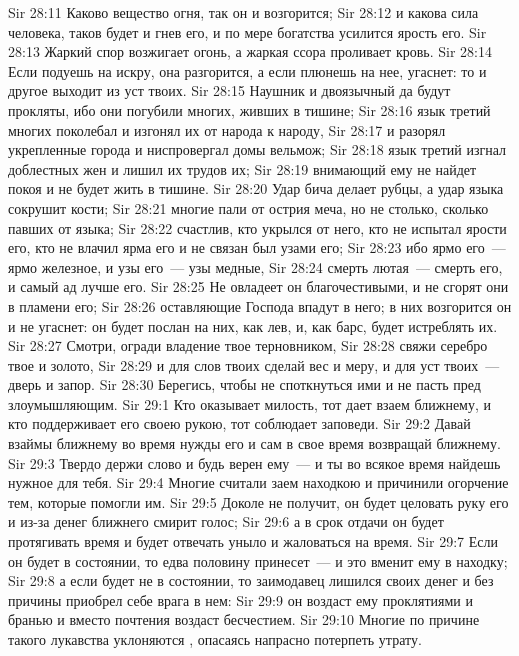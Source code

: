 \vs Sir 28:11 Каково вещество огня, так он и возгорится;
\vs Sir 28:12 и какова сила человека, таков будет и гнев его, и по мере богатства усилится ярость его.
\vs Sir 28:13 Жаркий спор возжигает огонь, а жаркая ссора проливает кровь.
\vs Sir 28:14 Если подуешь на искру, она разгорится, а если плюнешь на нее, угаснет: то и другое выходит из уст твоих.
\rsbpar\vs Sir 28:15 Наушник и двоязычный да будут прокляты, ибо они погубили многих, живших в тишине;
\vs Sir 28:16 язык третий многих поколебал и изгонял их от народа к народу,
\vs Sir 28:17 и разорял укрепленные города и ниспровергал домы вельмож;
\vs Sir 28:18 язык третий изгнал доблестных жен и лишил их трудов их;
\vs Sir 28:19 внимающий ему не найдет покоя и не будет жить в тишине.
\vs Sir 28:20 Удар бича делает рубцы, а удар языка сокрушит кости;
\vs Sir 28:21 многие пали от острия меча, но не столько, сколько павших от языка;
\vs Sir 28:22 счастлив, кто укрылся от него, кто не испытал ярости его, кто не влачил ярма его и не связан был узами его;
\vs Sir 28:23 ибо ярмо его~--- ярмо железное, и узы его~--- узы медные,
\vs Sir 28:24 смерть лютая~--- смерть его, и самый ад лучше его.
\vs Sir 28:25 Не овладеет он благочестивыми, и не сгорят они в пламени его;
\vs Sir 28:26 оставляющие Господа впадут в него; в них возгорится он и не угаснет: он будет послан на них, как лев, и, как барс, будет истреблять их.
\vs Sir 28:27 Смотри, огради владение твое терновником,
\vs Sir 28:28 свяжи серебро твое и золото,
\vs Sir 28:29 и для слов твоих сделай вес и меру, и для уст твоих~--- дверь и запор.
\vs Sir 28:30 Берегись, чтобы не споткнуться ими и не пасть пред злоумышляющим.
\vs Sir 29:1 Кто оказывает милость, тот дает взаем ближнему, и кто поддерживает его своею рукою, тот соблюдает заповеди.
\vs Sir 29:2 Давай взаймы ближнему во время нужды его и сам в свое время возвращай ближнему.
\vs Sir 29:3 Твердо держи слово и будь верен ему~--- и ты во всякое время найдешь нужное для тебя.
\vs Sir 29:4 Многие считали заем находкою и причинили огорчение тем, которые помогли им.
\vs Sir 29:5 Доколе не получит, он будет целовать руку его и из-за денег ближнего смирит голос;
\vs Sir 29:6 а в срок отдачи он будет протягивать время и будет отвечать уныло и жаловаться на время.
\vs Sir 29:7 Если он будет в состоянии, то едва половину принесет~--- и это вменит ему в находку;
\vs Sir 29:8 а если будет не в состоянии, то заимодавец лишился своих денег и без причины приобрел себе врага в нем:
\vs Sir 29:9 он воздаст ему проклятиями и бранью и вместо почтения воздаст бесчестием.
\vs Sir 29:10 Многие по причине такого лукавства уклоняются , опасаясь напрасно потерпеть утрату.
